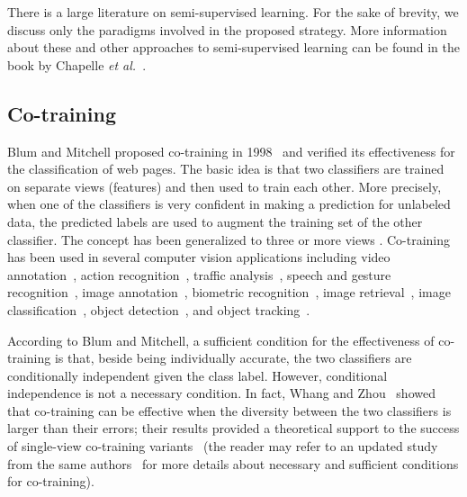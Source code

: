 \documentclass[journal,11pt]{IEEEtran}
\newcommand{\coso}{strategy}
\begin{document}
There is a large literature on semi-supervised learning. For the sake
of brevity, we discuss only the paradigms involved in the proposed
\coso.  More information about these and other approaches to
semi-supervised learning can be found in the book by Chapelle \emph{et
  al.}~\cite{chapelle2006semi}.

\subsection{Co-training}
Blum and Mitchell proposed co-training in
1998~\cite{blum1998combining} and verified its effectiveness for the
classification of web pages.  The basic idea is that two classifiers
are trained on separate views (features) and then used to train each
other.  More precisely, when one of the classifiers is very confident
in making a prediction for unlabeled data, the predicted labels are
used to augment the training set of the other classifier.
The concept has been generalized to three \cite{zhou2005tritraining} or more views \cite{li2007improve,zhou2011semi}.
Co-training has been used in several computer vision applications including video
annotation~\cite{wang2006enhanced}, action
recognition~\cite{gupta2008watch}, traffic
analysis~\cite{levin2003unsupervised}, speech and gesture
recognition~\cite{christoudias2006coadaptation}, image
annotation~\cite{feng2003bootstrapping}, biometric
recognition~\cite{bhatt2011cotraining}, image
retrieval~\cite{tong2001support}, image
classification~\cite{guillaumin2010multimodal},
object detection~\cite{levin2003unsupervised,javed2005online}, and object tracking~\cite{tang2007co}.

According to Blum and Mitchell, a sufficient condition for the
effectiveness of co-training is that, beside being individually
accurate, the two classifiers are conditionally independent given the
class label.  However, conditional independence is not a necessary
condition.  In fact, Whang and Zhou~\cite{wang2007analyzing} showed
that co-training can be effective when the diversity between the two
classifiers is larger than their errors; their results provided a
theoretical support to the success of single-view co-training
variants~\cite{goldman2000enhancing,chen2011automatic,wang2013co} (the reader
may refer to an updated study from the same authors~\cite{wang2010new}
for more details about necessary and sufficient conditions for
co-training).
\end{document}
